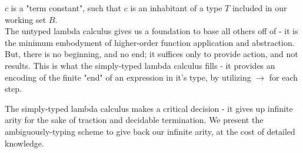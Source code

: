 \documentclass{article}
\begin{document}

\begin{flushleft}
$c$ is a "term constant", such that $c$ is an inhabitant of a type $T$ included
in our working set $B$.\\
\break
The untyped lambda calculus gives us a foundation to base all others off of -
it is the minimum embodyment of higher-order function application and abstraction.
But, there is no beginning, and no end; it suffices only to provide action, and
not results. This is what the simply-typed lambda calculus fills - it provides
an encoding of the finite "end" of an expression in it's type, by utilizing
$\rightarrow$ for each step.

The simply-typed lambda calculus makes a critical decision - it gives up
infinite arity for the sake of traction and decidable termination.
We present the ambiguously-typing scheme to give back our
infinite arity, at the cost of detailed knowledge.
\end{flushleft}
\end{document}
